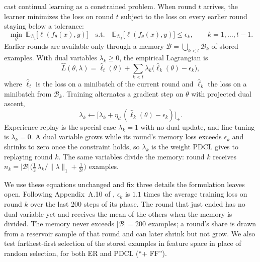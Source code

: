 \documentclass[10pt]{article}
\begin{document}
\citet{elenter2023primal} cast continual learning as a constrained problem. When round $t$ arrives, the learner minimizes the loss on round $t$ subject to the loss on every earlier round staying below a tolerance:
\begin{equation}
\min_{\theta}\ \mathbb{E}_{\mathcal{D}_t}\big[\ell(f_\theta(x),y)\big]
\quad\text{s.t.}\quad
\mathbb{E}_{\mathcal{D}_k}\big[\ell(f_\theta(x),y)\big]\le\epsilon_k,\qquad k=1,\dots,t-1 .
\label{eq:problem}
\end{equation}
Earlier rounds are available only through a memory $\mathcal{B}=\bigcup_{k<t}\mathcal{B}_k$ of stored examples. With dual variables $\lambda_k\ge 0$, the empirical Lagrangian is
\begin{equation}
\hat{L}(\theta,\lambda)=\hat{\ell}_t(\theta)+\sum_{k<t}\lambda_k\big(\hat{\ell}_k(\theta)-\epsilon_k\big),
\label{eq:lagrangian}
\end{equation}
where $\hat{\ell}_t$ is the loss on a minibatch of the current round and $\hat{\ell}_k$ the loss on a minibatch from $\mathcal{B}_k$. Training alternates a gradient step on $\theta$ with projected dual ascent,
\begin{equation}
\lambda_k\leftarrow\big[\lambda_k+\eta_d\,(\hat{\ell}_k(\theta)-\epsilon_k)\big]_+ .
\label{eq:dual}
\end{equation}
Experience replay \citep[ER;][]{chaudhry2019tiny} is the special case $\lambda_k=1$ with no dual update, and fine-tuning is $\lambda_k=0$. A dual variable grows while its round's memory loss exceeds $\epsilon_k$ and shrinks to zero once the constraint holds, so $\lambda_k$ is the weight PDCL gives to replaying round $k$. The same variables divide the memory: round $k$ receives
$n_k=|\mathcal{B}|\big(\tfrac12\,\lambda_k/\lVert\lambda\rVert_1+\tfrac{1}{2t}\big)$ examples.

We use these equations unchanged and fix three details the formulation leaves open. Following Appendix~A.10 of \citet{elenter2023primal}, $\epsilon_k$ is $1.1$ times the average training loss on round $k$ over the last 200 steps of its phase. The round that just ended has no dual variable yet and receives the mean of the others when the memory is divided. The memory never exceeds $|\mathcal{B}|=200$ examples; a round's share is drawn from a reservoir sample of that round and can later shrink but not grow. We also test farthest-first selection of the stored examples in feature space \citep{gonzalez1985clustering,sener2018active} in place of random selection, for both ER and PDCL (``+ FF'').
\end{document}
